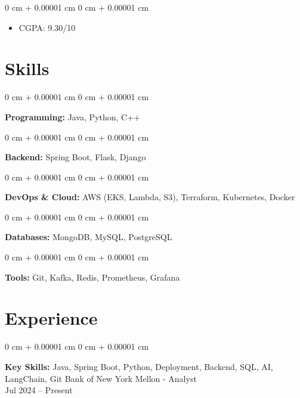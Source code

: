 \documentclass[10pt, letterpaper]{article}
\newenvironment{highlights}{
    \begin{itemize}[
        topsep=0.10 cm,
        parsep=0.10 cm,
        partopsep=0pt,
        itemsep=0pt,
        leftmargin=0 cm + 10pt
    ]
}{
    \end{itemize}
} %
\newenvironment{onecolentry}{
    \begin{adjustwidth}{
        0 cm + 0.00001 cm
    }{
        0 cm + 0.00001 cm
    }
}{
    \end{adjustwidth}
} %
\newenvironment{twocolentry}[2][]{
    \onecolentry
    \def\secondColumn{#2}
    \setcolumnwidth{\fill, 4.5 cm}
    \begin{paracol}{2}
}{
    \switchcolumn \raggedleft \secondColumn
    \end{paracol}
    \endonecolentry
} %
\begin{document}
        \vspace{0.10 cm}
        \begin{onecolentry}
            \begin{highlights}
                \item CGPA: 9.30/10
            \end{highlights}
        \end{onecolentry}

    \section{Skills}

        \begin{onecolentry}
            \textbf{Programming:} Java, Python, C++
        \end{onecolentry}

        \vspace{0.2 cm}

        \begin{onecolentry}
            \textbf{Backend:} Spring Boot, Flask, Django
        \end{onecolentry}

        \vspace{0.2 cm}

        \begin{onecolentry}
            \textbf{DevOps \& Cloud:} AWS (EKS, Lambda, S3), Terraform, Kubernetes, Docker
        \end{onecolentry}

        \vspace{0.2 cm}

        \begin{onecolentry}
            \textbf{Databases:} MongoDB, MySQL, PostgreSQL
        \end{onecolentry}

        \vspace{0.2 cm}

        \begin{onecolentry}
            \textbf{Tools:} Git, Kafka, Redis, Prometheus, Grafana
        \end{onecolentry}

    \section{Experience}

        \begin{twocolentry}{
            Bank of New York Mellon - Analyst \\ Jul 2024 – Present
        }
            \textbf{Key Skills:} Java, Spring Boot, Python, Deployment, Backend, SQL, AI, LangChain, Git\end{twocolentry}
\end{document}
